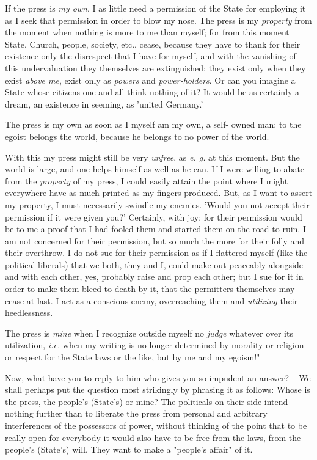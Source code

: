 \documentclass[a4paper]{book}
\begin{document}
If the press is \textit{my own}, I as little need a permission of the State 
for employing it as I seek that permission in order to blow my nose. The press 
is my \textit{property} from the moment when nothing is more to me than 
myself; for from this moment State, Church, people, society, etc., cease, 
because they have to thank for their existence only the disrespect that I have 
for myself, and with the vanishing of this undervaluation they themselves are 
extinguished: they exist only when they exist \textit{above me}, exist only as 
\textit{powers} and \textit{power-holders}. Or can you imagine a State whose 
citizens one and all think nothing of it? It would be as certainly a dream, an 
existence in seeming, as 'united Germany.'

The press is my own as soon as I myself am my own, a self- owned man: to the 
egoist belongs the world, because he belongs to no power of the world.

With this my press might still be very \textit{unfree}, as \textit{e. g.} at 
this moment. But the world is large, and one helps himself as well as he can. 
If I were willing to abate from the \textit{property} of my press, I could 
easily attain the point where I might everywhere have as much printed as my 
fingers produced. But, as I want to assert my property, I must necessarily 
swindle my enemies. 'Would you not accept their permission if it were given 
you?' Certainly, with joy; for their permission would be to me a proof that I 
had fooled them and started them on the road to ruin. I am not concerned for 
their permission, but so much the more for their folly and their overthrow. I 
do not sue for their permission as if I flattered myself (like the political 
liberals) that we both, they and I, could make out peaceably alongside and 
with each other, yes, probably raise and prop each other; but I sue for it in 
order to make them bleed to death by it, that the permitters themselves may 
cease at last. I act as a conscious enemy, overreaching them and 
\textit{utilizing} their heedlessness.

The press is \textit{mine} when I recognize outside myself no \textit{judge} 
whatever over its utilization, \textit{i.e.} when my writing is no longer 
determined by morality or religion or respect for the State laws or the like, 
but by me and my egoism!"{}

Now, what have you to reply to him who gives you so impudent an answer? -- We 
shall perhaps put the question most strikingly by phrasing it as follows: 
Whose is the press, the people's (State's) or mine? The politicals on their 
side intend nothing further than to liberate the press from personal and 
arbitrary interferences of the possessors of power, without thinking of the 
point that to be really open for everybody it would also have to be free from 
the laws, from the people's (State's) will. They want to make a "{}people's 
affair"{} of it.
\end{document}
